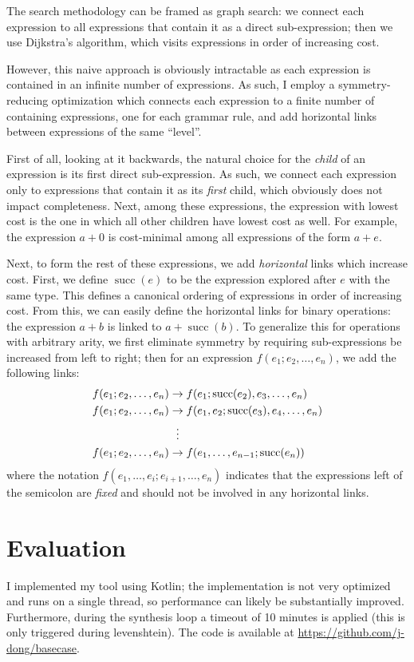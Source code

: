 \documentclass{article}
\newcommand*{\Succ}{\operatorname{succ}}
\begin{document}
The search methodology can be framed as graph search:
we connect each expression to all expressions that contain it as
a direct sub-expression; then we use Dijkstra's algorithm, which
visits expressions in order of increasing cost.

However, this naive approach is obviously intractable as each
expression is contained in an infinite number of expressions.
As such, I employ a symmetry-reducing optimization which connects
each expression to a finite number of containing expressions,
one for each grammar rule, and add horizontal links between expressions
of the same ``level''.

First of all, looking at it backwards, the natural choice for the \emph{child}
of an expression is its first direct sub-expression. As such, we connect each
expression only to expressions that contain it as its \emph{first} child,
which obviously does not impact completeness.
Next, among these expressions, the expression with lowest cost is the one
in which all other children have lowest cost as well. For example,
the expression $a + 0$ is cost-minimal among all expressions of the form $a + e$.

Next, to form the rest of these expressions, we add \emph{horizontal} links
which increase cost. First, we define $\Succ(e)$ to be the expression explored
after $e$ with the same type. This defines a canonical ordering of expressions
in order of increasing cost. From this, we can easily define the horizontal
links for binary operations: the expression $a + b$ is linked to $a + \Succ(b)$.
To generalize this for operations with arbitrary arity, we first eliminate symmetry
by requiring sub-expressions be increased from left to right; then
for an expression $f(e_1; e_2, \dots, e_n)$, we add the following links:
\begin{align*}
    f(e_1; e_2, \dots, e_n)
    &\to f(e_1; \Succ(e_2), e_3, \dots, e_n) \\
    f(e_1; e_2, \dots, e_n)
    &\to f(e_1, e_2; \Succ(e_3), e_4, \dots, e_n) \\
    &\vdotswithin{\to} \\
    f(e_1; e_2, \dots, e_n)
    &\to f(e_1, \dots, e_{n-1}; \Succ(e_n))
\end{align*}
where the notation $f(e_1, \dots, e_i; e_{i+1}, \dots, e_n)$ indicates that
the expressions left of the semicolon are \emph{fixed} and should not be
involved in any horizontal links.

\section{Evaluation}
I implemented my tool using Kotlin; the implementation is not very
optimized and runs on a single thread, so performance can likely be
substantially improved. Furthermore, during the synthesis loop
a timeout of 10 minutes is applied (this is only triggered during
levenshtein).
The code is available at
\url{https://github.com/j-dong/basecase}.
\end{document}
